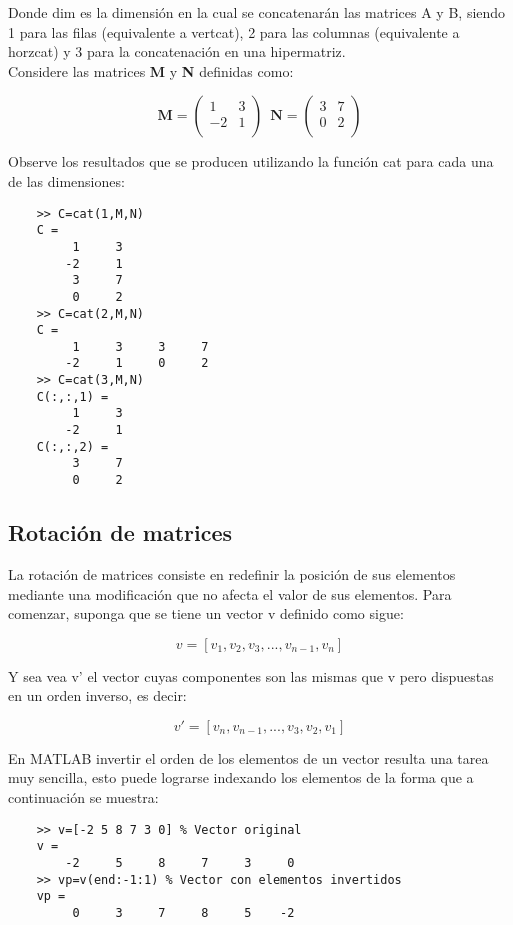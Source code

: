 Donde dim es la dimensión en la cual se concatenarán las matrices A y B, siendo 
1 para las filas (equivalente a vertcat), 2 para las columnas (equivalente a horzcat) 
y 3 para la concatenación en una hipermatriz.\\

Considere las matrices \textbf{M} y \textbf{N} definidas como:

\begin{center}
$$\textbf{M}=\begin{pmatrix}
1 & 3 \\
-2 & 1 \\
\end{pmatrix}\,\,\,
 \textbf{N}=\begin{pmatrix}
3 & 7 \\
0 & 2 \\
\end{pmatrix}$$
\end{center}

Observe los resultados que se producen utilizando la función cat para cada una de las dimensiones:

\begin{verbatim}
	>> C=cat(1,M,N)
	C =
	     1     3
	    -2     1
	     3     7
	     0     2
	>> C=cat(2,M,N)
	C =
	     1     3     3     7
	    -2     1     0     2
	>> C=cat(3,M,N)
	C(:,:,1) =
	     1     3
	    -2     1
	C(:,:,2) =
	     3     7
	     0     2
\end{verbatim}

\subsection{Rotación de matrices}

La rotación de matrices consiste en redefinir la posición de sus elementos mediante 
una modificación que no afecta el valor de sus elementos. Para comenzar, suponga que 
se tiene un vector v definido como sigue:
	
$$v=[v_1,v_2,v_3,...,v_{n-1},v_n]$$
	  
Y sea vea v’ el vector cuyas componentes son las mismas que v pero dispuestas en un 
orden inverso, es decir:

$$v'=[v_n,v_{n-1},...,v_3,v_2,v_1]$$

En MATLAB invertir el orden de los elementos de un vector resulta una tarea muy sencilla, 
esto puede lograrse indexando los elementos de la forma que a continuación se muestra:

\begin{verbatim}
	>> v=[-2 5 8 7 3 0] % Vector original
	v =
	    -2     5     8     7     3     0
	>> vp=v(end:-1:1) % Vector con elementos invertidos
	vp =
	     0     3     7     8     5    -2
\end{verbatim}

